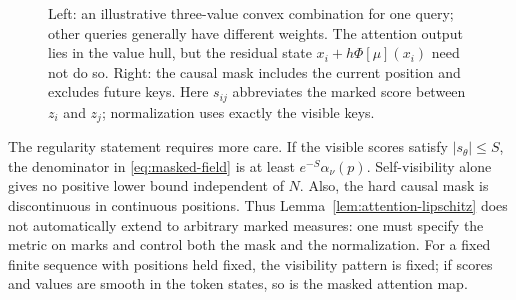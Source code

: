 \documentclass[11pt]{amsart}
\numberwithin{equation}{section}
\theoremstyle{plain}
\newcommand{\abs}[1]{\left\lvert#1\right\rvert}
\newcommand{\one}{\mathbf{1}}
\begin{document}
\begin{figure}[htbp]
\centering
{}
\caption{ Left: an illustrative three-value convex combination for
one query; other queries generally have different weights.  The attention
output lies in the value hull, but the residual state $x_i+h\Phi[\mu](x_i)$
need not do so.  Right: the causal mask includes the current position and
excludes future keys.  Here $s_{ij}$ abbreviates the marked score between
$z_i$ and $z_j$; normalization uses exactly the visible keys.}
\label{fig:ips-attention-geometry}
\end{figure}

The regularity statement requires more care.  If the visible scores satisfy
$\abs{s_\theta}\leq S$, the denominator in \eqref{eq:masked-field} is at
least $e^{-S}\alpha_\nu(p)$.  Self-visibility alone gives no positive lower
bound independent of $N$.  Also, the hard causal mask is discontinuous in
continuous positions.  Thus Lemma~\ref{lem:attention-lipschitz} does not
automatically extend to arbitrary marked measures: one must specify the
metric on marks and control both the mask and the normalization.  For a
fixed finite sequence with positions held fixed, the visibility pattern is
fixed; if scores and values are smooth in the token states, so is the masked
attention map.
\end{document}
